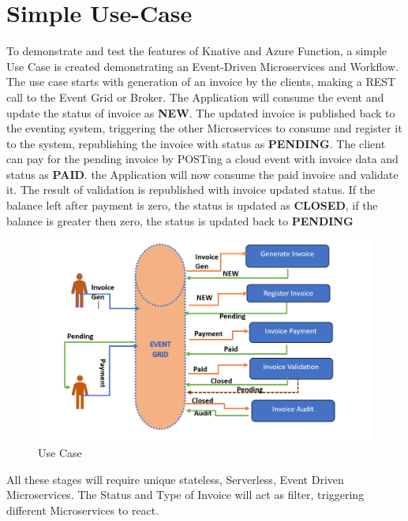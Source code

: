 \documentclass{article}
\begin{document}
\section{Simple Use-Case}
\begin{flushleft}
To demonstrate and test the features of Knative and Azure Function, a simple Use Case is created demonstrating an Event-Driven Microservices and Workflow.
\hfill \break
The use case starts with generation of an invoice by the clients, making a REST call to the Event Grid or Broker. The Application will consume the event and update the status of invoice as \textbf{NEW}.
The updated invoice is published back to the eventing system, triggering the other Microservices to consume and register it to the system, republishing the invoice with status as \textbf{PENDING}. The client can pay for the pending invoice by POSTing a cloud event with invoice data and status as \textbf{PAID}. the Application will now consume the paid invoice and validate it. The result of validation is republished with invoice updated status. If the balance left after payment is zero, the status is updated as \textbf{CLOSED}, if the balance is greater then zero, the status is updated back to \textbf{PENDING}
\begin{figure}[h]
    \centering
    \includegraphics[width=1.00\linewidth]{images/UseCase.PNG}
    \caption{Use Case}
\end{figure}

All these stages will require unique stateless, Serverless, Event Driven Microservices. The Status and Type of Invoice will act as filter, triggering different Microservices to react. 
\break


\end{flushleft}
\end{document}
